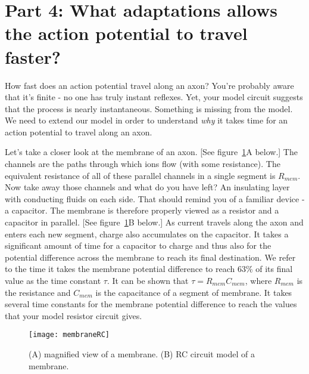 \section*{Part 4: What adaptations allows the action potential to travel faster?}
How fast does an action potential travel along an axon?
You're probably aware that it's finite - no one has truly instant reflexes.
Yet, your model circuit suggests that the process is nearly instantaneous.
Something is missing from the model.
We need to extend our model in order to understand \emph{why} it takes time for an action potential to travel along an axon.
\par 
Let's take a closer look at the membrane of an axon.
[See figure~\ref{fig:memRC}A below.]
The channels are the paths through which ions flow (with some resistance).
The equivalent resistance of all of these parallel channels in a single segment is $R_{mem}$.
Now take away those channels and what do you have left?
An insulating layer with conducting fluids on each side.
That should remind you of a familiar device - a capacitor.
The membrane is therefore properly viewed as a resistor and a capacitor in parallel.
[See figure~\ref{fig:memRC}B below.]
As current travels along the axon and enters each new segment, charge also accumulates on the capacitor.
It takes a significant amount of time for a capacitor to charge and thus also for the potential difference across the membrane to reach its final destination.
We refer to the time it takes the membrane potential difference to reach 63\% of its final value as the time constant $\tau$.
It can be shown that $\tau = R_{mem}C_{mem}$, where $R_{mem}$ is the resistance and $C_{mem}$ is the capacitance of a segment of membrane.
It takes several time constants for the membrane potential difference to reach the values that your model resistor circuit gives.
\begin{figure}[hbtp]
\centering
\texttt{[image: membraneRC]}
\caption{(A) magnified view of a membrane. (B) RC circuit model of a membrane.}
\label{fig:memRC}
\end{figure}


